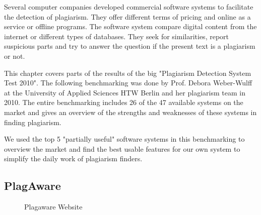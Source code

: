 Several computer companies developed commercial software systems to facilitate the detection of plagiarism. They offer different terms of pricing and online as a service or offline programs. 
The software system compare digital content from the internet or different types of databases. 
They seek for similarities, report suspicious parts and try to answer the question if the present text is a plagiarism or not.

This chapter covers parts of the results of the big "Plagiarism Detection System Test 2010". 
The following benchmarking was done by Prof. Debora Weber-Wulff at the University of Applied Sciences HTW Berlin and her plagiarism team in 2010. \citep{PlagiatTeam} 
The entire benchmarking includes 26 of the 47 available systems on the market and gives an overview of the strengths and weaknesses of these systems in finding plagiarism.

We used the top 5 "partially useful" software systems in this  benchmarking to overview the market and find the best usable features for our own system to simplify the daily work of plagiarism finders. 
\citep{PlagiatTeam} 






\newpage



\subsection{PlagAware} 
 \begin{figure}[!h]
  \centering
  \caption{Plagaware Website}
  \label{fig:plagawareWebsite}
\end{figure}


